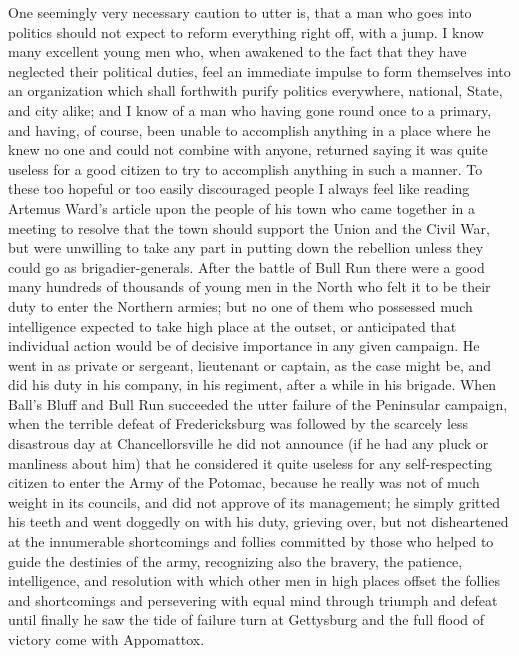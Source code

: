\documentclass[a4paper]{amsbook}
\begin{document}
One seemingly very necessary caution to utter is, that a man who goes into politics should not expect to reform everything right off, with a jump. I know many excellent young men who, when awakened to the fact that they have neglected their political duties, feel an immediate impulse to form themselves into an organization which shall forthwith purify politics everywhere, national, State, and city alike; and I know of a man who having gone round once to a primary, and having, of course, been unable to accomplish anything in a place where he knew no one and could not combine with anyone, returned saying it was quite useless for a good citizen to try to accomplish anything in such a manner. To these too hopeful or too easily discouraged people I always feel like reading Artemus Ward's article upon the people of his town who came together in a meeting to resolve that the town should support the Union and the Civil War, but were unwilling to take any part in putting down the rebellion unless they could go as brigadier-generals. After the battle of Bull Run there were a good many hundreds of thousands of young men in the North who felt it to be their duty to enter the Northern armies; but no one of them who possessed much intelligence expected to take high place at the outset, or anticipated that individual action would be of decisive importance in any given campaign. He went in as private or sergeant, lieutenant or captain, as the case might be, and did his duty in his company, in his regiment, after a while in his brigade. When Ball's Bluff and Bull Run succeeded the utter failure of the Peninsular campaign, when the terrible defeat of Fredericksburg was followed by the scarcely less disastrous day at Chancellorsville he did not announce (if he had any pluck or manliness about him) that he considered it quite useless for any self-respecting citizen to enter the Army of the Potomac, because he really was not of much weight in its councils, and did not approve of its management; he simply gritted his teeth and went doggedly on with his duty, grieving over, but not disheartened at the innumerable shortcomings and follies committed by those who helped to guide the destinies of the army, recognizing also the bravery, the patience, intelligence, and resolution with which other men in high places offset the follies and shortcomings and persevering with equal mind through triumph and defeat until finally he saw the tide of failure turn at Gettysburg and the full flood of victory come with Appomattox.
\end{document}
